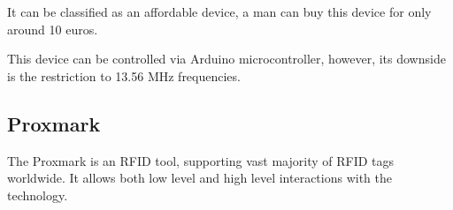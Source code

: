 It can be classified as an affordable device, a man can buy this device for only around 10 euros.~\cite{pn532shop}

This device can be controlled via Arduino microcontroller, however, its downside is the restriction to 13.56 MHz frequencies.


\subsection{Proxmark}

The Proxmark is an RFID tool, supporting vast majority of RFID tags worldwide. It allows both low level and high level interactions with the technology.  

